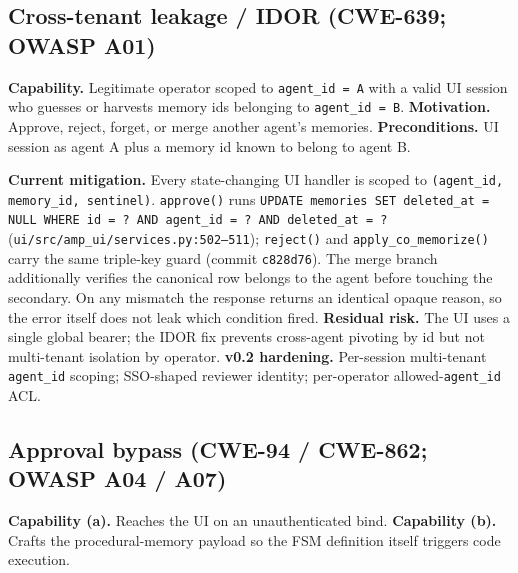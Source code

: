 \documentclass[11pt,letterpaper,twocolumn]{article}
\begin{document}
\subsection{Cross-tenant leakage / IDOR (CWE-639; OWASP A01)}
\label{sec:threats-idor}

\textbf{Capability.} Legitimate operator scoped to \texttt{agent\_id = A} with a valid UI session who guesses or harvests memory ids belonging to \texttt{agent\_id = B}. \textbf{Motivation.} Approve, reject, forget, or merge another agent's memories. \textbf{Preconditions.} UI session as agent A plus a memory id known to belong to agent B.

\textbf{Current mitigation.} Every state-changing UI handler is scoped to \texttt{(agent\_id, memory\_id, sentinel)}. \texttt{approve()} runs \texttt{UPDATE memories SET deleted\_at = NULL WHERE id = ? AND agent\_id = ? AND deleted\_at = ?} (\texttt{ui/src/amp\_ui/services.py:502--511}); \texttt{reject()} and \texttt{apply\_co\_memorize()} carry the same triple-key guard (commit \texttt{c828d76}). The merge branch additionally verifies the canonical row belongs to the agent before touching the secondary. On any mismatch the response returns an identical opaque reason, so the error itself does not leak which condition fired. \textbf{Residual risk.} The UI uses a single global bearer; the IDOR fix prevents cross-agent pivoting by id but not multi-tenant isolation by operator. \textbf{v0.2 hardening.} Per-session multi-tenant \texttt{agent\_id} scoping; SSO-shaped reviewer identity; per-operator allowed-\texttt{agent\_id} ACL.

\subsection{Approval bypass (CWE-94 / CWE-862; OWASP A04 / A07)}
\label{sec:threats-bypass}

\textbf{Capability (a).} Reaches the UI on an unauthenticated bind. \textbf{Capability (b).} Crafts the procedural-memory payload so the FSM definition itself triggers code execution.
\end{document}
